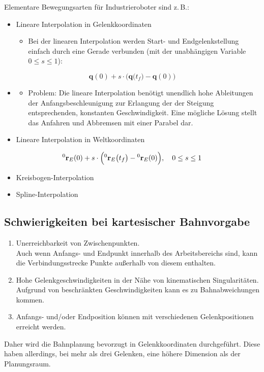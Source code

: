 \documentclass[a4paper, 11pt, accentcolor = tud3b]{tudreport}
\renewcommand{\vec}[1]{\boldsymbol{\mathbf{#1}}}
\begin{document}
			Elementare Bewegungsarten für Industrieroboter sind z.\,B.:
			\begin{itemize}
				\item Lineare Interpolation in Gelenkkoordinaten
					\begin{itemize}
						\item Bei der linearen Interpolation werden Start- und Endgelenkstellung einfach durch eine Gerade verbunden (mit der unabhängigen Variable \( 0 \leq s \leq 1 \)):
					\end{itemize}
			\end{itemize}
			\begin{equation*}
				\vec{q}(0) + s \cdot \Big( \vec{q}\big(t_f\big) - \vec{q}(0) \Big)
			\end{equation*}
			\begin{itemize}
				\item[]
					\begin{itemize}
						\item Problem: Die lineare Interpolation benötigt unendlich hohe Ableitungen der Anfangsbeschleunigung zur Erlangung der der Steigung entsprechenden, konstanten Geschwindigkeit. Eine mögliche Lösung stellt das Anfahren und Abbremsen mit einer Parabel dar.
					\end{itemize}
				\item Lineare Interpolation in Weltkoordinaten
			\end{itemize}
			\begin{equation*}
				\prescript{0}{}{\vec{r}}_E(0) + s \cdot \Big(\! \prescript{0}{}{\vec{r}}_E \big(t_f\big) - \prescript{0}{}{\vec{r}}_E(0) \Big),\quad 0 \leq s \leq 1
			\end{equation*}
			\begin{itemize}
				\item Kreisbogen-Interpolation
				\item Spline-Interpolation
			\end{itemize}

			\subsection{Schwierigkeiten bei kartesischer Bahnvorgabe}
				\begin{enumerate}
					\item Unerreichbarkeit von Zwischenpunkten. \\ Auch wenn Anfangs- und Endpunkt innerhalb des Arbeitsbereichs sind, kann die Verbindungsstrecke Punkte außerhalb von diesem enthalten.
					\item Hohe Gelenkgeschwindigkeiten in der Nähe von kinematischen Singularitäten. \\ Aufgrund von beschränkten Geschwindigkeiten kann es zu Bahnabweichungen kommen.
					\item Anfangs- und/oder Endposition können mit verschiedenen Gelenkpositionen erreicht werden.
				\end{enumerate}
				Daher wird die Bahnplanung bevorzugt in Gelenkkoordinaten durchgeführt. Diese haben allerdings, bei mehr als drei Gelenken, eine höhere Dimension als der Planungsraum.
\end{document}
